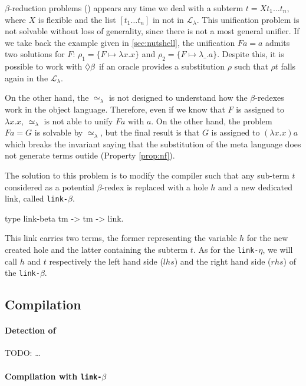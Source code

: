 \documentclass[sigconf,natbib=false,review]{acmart}
\newcommand{\UnifRel}{\ensuremath{\simeq}}
\newcommand{\Ue}{\ensuremath{\UnifRel_\lambda}\xspace}
\newcommand{\llambda}{\ensuremath{\mathcal{L}_\lambda}\xspace}
\newcommand{\linkbeta}{\texttt{link-}\ensuremath{\beta}\xspace}
\newcommand{\linketa}{\texttt{link-}\ensuremath{\eta}\xspace}
\begin{document}
$\beta$-reduction problems (\maybebeta) appears any time we deal with a subterm $t
= X t_1 \dots t_n$, where $X$ is flexible and the list $[t_1 \dots t_n]$ in not
in \llambda. This unification problem is not solvable without loss of
generality, since there is not a most general unifier. If we take back the
example given in \cref{sec:nutshell}, the unification $F a = a$ admits two solutions for $F$:
$\rho_1 = \{F \mapsto \lambda x.x\}$ and $\rho_2 = \{F \mapsto \lambda \_.a\}$.
Despite this, it is possible to work with $\Diamond\beta$ if an oracle provides a
substitution $\rho$ such that $\rho t$ falls again in the \llambda.

On the other hand, the \Ue is not designed to understand how the $\beta$-redexes
work in the object language. Therefore, even if we know that $F$ is assigned
to $\lambda x.x$, \Ue is not able to unify $F a$ with $a$. On the other hand,
the problem $F a = G$ is solvable by \Ue, but the final result is that $G$ is
assigned to $(\lambda x.x) a$ which breaks the invariant saying that the
substitution of the meta language does not generate terms outide \wellb{} (Property \ref{prop:nf}).

The solution to this problem is to modify the compiler such that any sub-term $t$
considered as a potential $\beta$-redex is replaced with a hole $h$ and a new dedicated
link, called \linkbeta.

\begin{elpicode}
  type link-beta tm -> tm -> link.
\end{elpicode}

\def\rhs{\ensuremath{rhs}\xspace}
\def\lhs{\ensuremath{lhs}\xspace}

This link carries two terms, the former representing the variable $h$ for the
new created hole and the latter containing the subterm $t$. As for the \linketa,
we will call $h$ and $t$ respectively the left hand side (\lhs)
and the right hand side (\rhs) of the \linkbeta.

\subsection{Compilation}

\paragraph{Detection of \maybebeta} TODO: \dots

\paragraph{Compilation with \linkbeta}
\end{document}
